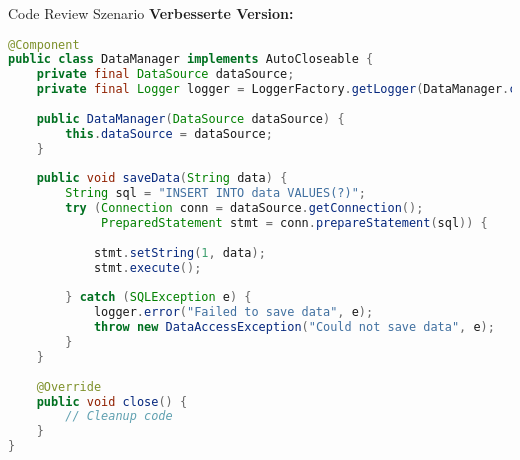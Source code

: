 \begin{example2}[breakable]{Code Review Szenario}
\textbf{Verbesserte Version:}
\begin{lstlisting}[language=Java, style=base]
@Component
public class DataManager implements AutoCloseable {
    private final DataSource dataSource;
    private final Logger logger = LoggerFactory.getLogger(DataManager.class);
    
    public DataManager(DataSource dataSource) {
        this.dataSource = dataSource;
    }
    
    public void saveData(String data) {
        String sql = "INSERT INTO data VALUES(?)";
        try (Connection conn = dataSource.getConnection();
             PreparedStatement stmt = conn.prepareStatement(sql)) {
            
            stmt.setString(1, data);
            stmt.execute();
            
        } catch (SQLException e) {
            logger.error("Failed to save data", e);
            throw new DataAccessException("Could not save data", e);
        }
    }
    
    @Override
    public void close() {
        // Cleanup code
    }
}
\end{lstlisting}
\end{example2}